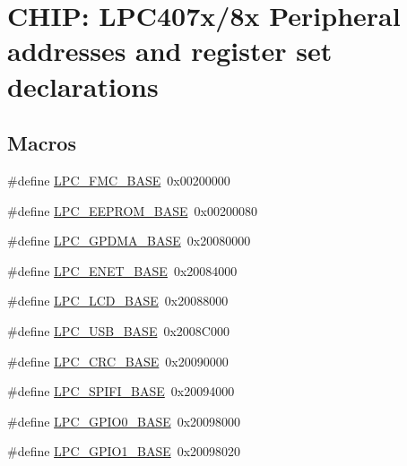 \hypertarget{group__PERIPH__407X__8X__BASE}{\section{C\-H\-I\-P\-: L\-P\-C407x/8x Peripheral addresses and register set declarations}
\label{group__PERIPH__407X__8X__BASE}
}
\subsection*{Macros}
\begin{DoxyCompactItemize}
\item 
\#define \hyperlink{group__PERIPH__407X__8X__BASE_gaad6b7f57ab13bf5886da624bbb4bcc61}{L\-P\-C\-\_\-\-F\-M\-C\-\_\-\-B\-A\-S\-E}~0x00200000
\item 
\#define \hyperlink{group__PERIPH__407X__8X__BASE_ga9d1fcaafb9feb0f8253c3cef1edc7e9f}{L\-P\-C\-\_\-\-E\-E\-P\-R\-O\-M\-\_\-\-B\-A\-S\-E}~0x00200080
\item 
\#define \hyperlink{group__PERIPH__407X__8X__BASE_ga51ba8e3f33730fa2b78be3f892d8c278}{L\-P\-C\-\_\-\-G\-P\-D\-M\-A\-\_\-\-B\-A\-S\-E}~0x20080000
\item 
\#define \hyperlink{group__PERIPH__407X__8X__BASE_ga73c18d53000abe3814c4b787cd83a57c}{L\-P\-C\-\_\-\-E\-N\-E\-T\-\_\-\-B\-A\-S\-E}~0x20084000
\item 
\#define \hyperlink{group__PERIPH__407X__8X__BASE_gae1746cd618a1eb4f24f95255594f159a}{L\-P\-C\-\_\-\-L\-C\-D\-\_\-\-B\-A\-S\-E}~0x20088000
\item 
\#define \hyperlink{group__PERIPH__407X__8X__BASE_gaa619008881e9f76dc31131313eff1b79}{L\-P\-C\-\_\-\-U\-S\-B\-\_\-\-B\-A\-S\-E}~0x2008\-C000
\item 
\#define \hyperlink{group__PERIPH__407X__8X__BASE_ga6d27804148d49c67065a8cd351ebc7b7}{L\-P\-C\-\_\-\-C\-R\-C\-\_\-\-B\-A\-S\-E}~0x20090000
\item 
\#define \hyperlink{group__PERIPH__407X__8X__BASE_gad284a5971366e0a8b5fe9881fdb9aa0c}{L\-P\-C\-\_\-\-S\-P\-I\-F\-I\-\_\-\-B\-A\-S\-E}~0x20094000
\item 
\#define \hyperlink{group__PERIPH__407X__8X__BASE_ga09e0e964ea1abf3b991772df2aa52405}{L\-P\-C\-\_\-\-G\-P\-I\-O0\-\_\-\-B\-A\-S\-E}~0x20098000
\item 
\#define \hyperlink{group__PERIPH__407X__8X__BASE_ga9fb0536853721a3073bd69d94d0b7ec2}{L\-P\-C\-\_\-\-G\-P\-I\-O1\-\_\-\-B\-A\-S\-E}~0x20098020

\end{DoxyCompactItemize}

